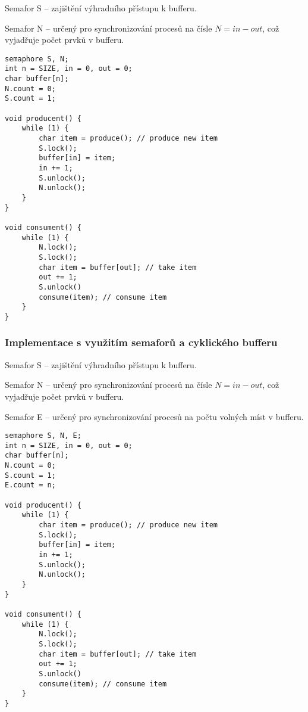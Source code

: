 \begin{compactitem}
    \item Semafor S -- zajištění výhradního přístupu k bufferu.
    \item Semafor N -- určený pro synchronizování procesů na čísle $N = in - out$, což vyjadřuje počet prvků v bufferu.
\end{compactitem}

\noindent\begin{minipage}{\linewidth}
\begin{lstlisting}[language=c_language, caption={Implementace s využitím semaforů.}]
semaphore S, N;
int n = SIZE, in = 0, out = 0;
char buffer[n];
N.count = 0;
S.count = 1;

void producent() {
    while (1) {
        char item = produce(); // produce new item
        S.lock();
        buffer[in] = item;
        in += 1;
        S.unlock();
        N.unlock();
    }
}

void consument() {
    while (1) {
        N.lock();
        S.lock();
        char item = buffer[out]; // take item
        out += 1;
        S.unlock()
        consume(item); // consume item
    }
}
\end{lstlisting}
\end{minipage}

\subsubsection{Implementace s využitím semaforů a cyklického bufferu}

\begin{compactitem}
    \item Semafor S -- zajištění výhradního přístupu k bufferu.
    \item Semafor N -- určený pro synchronizování procesů na čísle $N = in - out$, což vyjadřuje počet prvků v bufferu.
    \item Semafor E -- určený pro synchronizování procesů na počtu volných míst v bufferu.
\end{compactitem}

\noindent\begin{minipage}{\linewidth}
\begin{lstlisting}[language=c_language, caption={Implementace s využitím semaforů a cyklického bufferu.}]
semaphore S, N, E;
int n = SIZE, in = 0, out = 0;
char buffer[n];
N.count = 0;
S.count = 1;
E.count = n;

void producent() {
    while (1) {
        char item = produce(); // produce new item
        S.lock();
        buffer[in] = item;
        in += 1;
        S.unlock();
        N.unlock();
    }
}

void consument() {
    while (1) {
        N.lock();
        S.lock();
        char item = buffer[out]; // take item
        out += 1;
        S.unlock()
        consume(item); // consume item
    }
}
\end{lstlisting}
\end{minipage}

